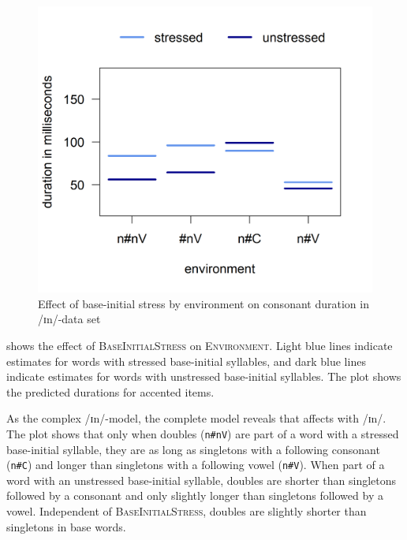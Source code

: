 	\begin{figure}
		 
		\includegraphics [scale=0.5] {images/Experiment/InModelCompleteInterEnvStress}
		
		\caption{Effect of base-initial stress by environment on consonant duration in /ɪn/-data set}	
		\label{fig:Env Stress In complete experiment} 
	\end{figure}%








 shows the effect of \textsc{BaseInitialStress} on \textsc{Environment}. Light blue lines indicate estimates for words with stressed base-initial syllables, and dark blue lines indicate estimates for words with unstressed base-initial syllables. The plot shows the predicted durations for accented items.



As the complex /ɪn/-model, the complete model reveals that  affects  with /ɪn/. 
The plot shows that only when doubles (\texttt{n\#nV}) are part of a word with a stressed base-initial syllable, they are as long as singletons with a following consonant  (\texttt{n\#C}) and longer than singletons with a following vowel  (\texttt{n\#V}). When part of a word with an unstressed base-initial syllable, doubles are shorter than singletons followed by a consonant and only slightly longer than singletons followed by a vowel. Independent of \textsc{BaseInitialStress}, doubles are slightly shorter than singletons in base words.




